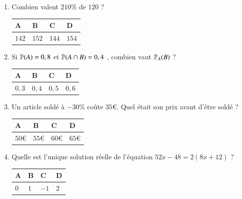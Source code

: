 \documentclass[oneside,12pt]{exam}          %
\begin{document}
\begin{enumerate}[label=\underline{Question \no\arabic*} :  , leftmargin=* , itemsep=5mm]
	\item Combien valent $210\%$ de $120$ ? 
	
		\hspace{\linewidth-\textwidth}
		\renewcommand{\arraystretch}{1.5}
		\begin{tabular}{| P{0.22\textwidth} | P{0.22\textwidth} | P{0.22\textwidth} | P{0.22\textwidth} |} \hline
			A & B & C & D \\ \hline
			$142$ & $152$ & $144$ & $154$ \\ \hline
		\end{tabular}



	\item Si ${\mathbb P}(A) = 0,8$ et ${\mathbb P}(A \cap B) = 0,4$ , combien vaut ${\mathbb P}_A(B)$ ?
	
		\hspace{\linewidth-\textwidth}
		\renewcommand{\arraystretch}{1.5}
		\begin{tabular}{| P{0.22\textwidth} | P{0.22\textwidth} | P{0.22\textwidth} | P{0.22\textwidth} |} \hline
			A & B & C & D \\ \hline
			$0,3$ & $0,4$ & $0,5$ & $0,6$ \\\hline
		\end{tabular}
		
		

	\item Un article soldé à $-30\%$ coûte $35$\euro. Quel était son prix avant d'être soldé ?
	
		\hspace{\linewidth-\textwidth}
		\renewcommand{\arraystretch}{1.5}
		\begin{tabular}{| P{0.22\textwidth} | P{0.22\textwidth} | P{0.22\textwidth} | P{0.22\textwidth} |} \hline
			A & B & C & D \\ \hline
			$50$\euro & $55$\euro & $60$\euro & $65$\euro \\\hline
		\end{tabular}
		
		

	\item Quelle est l'unique solution réelle de l'équation $52x - 48 = 2(8x + 12)$ ?
	
		\hspace{\linewidth-\textwidth}
		\renewcommand{\arraystretch}{1.5}
		\begin{tabular}{| P{0.22\textwidth} | P{0.22\textwidth} | P{0.22\textwidth} | P{0.22\textwidth} |} \hline
			A & B & C & D \\ \hline
			$0$ & $1$	& $-1$ & $2$ \\ \hline
		\end{tabular}
		

\end{enumerate}
\end{document}
